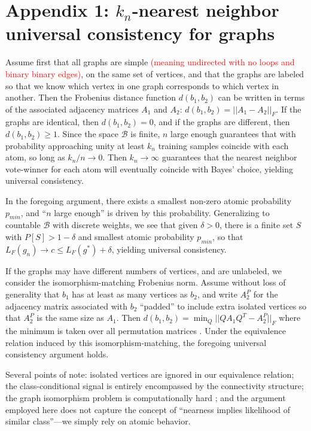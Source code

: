 \documentclass{article}
\newcommand{\mB}{\mathcal{B}}
\providecommand{\tr}[1]{\textcolor{red}{#1}}
\begin{document}
\section*{Appendix 1: $k_n$-nearest neighbor universal consistency for graphs}
\label{proof}

Assume first that all graphs are simple \tr{(meaning undirected with no loops and binary binary edges)}, on the same set of vertices, and that the graphs are labeled so that we know which vertex in one graph corresponds to which vertex in another. Then the Frobenius distance function $d(b_1,b_2)$ can be written in terms of the associated adjacency matrices $A_1$ and $A_2$: $d(b_1,b_2) = ||A_1-A_2||_F$. If the graphs are identical, then $d(b_1,b_2) = 0$, and if the graphs are different, then $d(b_1,b_2) \geq 1$. Since the space $\mB$ is finite, $n$ large enough guarantees that with probability approaching unity at least $k_n$ training samples coincide with each atom, so long as $k_n/n \rightarrow 0$. Then $k_n \rightarrow \infty$ guarantees that the nearest neighbor vote-winner for each atom will eventually coincide with Bayes' choice, yielding universal consistency.

In the foregoing argument, there exists a smallest non-zero atomic probability $p_{min}$, and ``$n$ large enough'' is driven by this probability. Generalizing to countable $\mB$ with discrete weights, we see that given $\delta > 0$, there is a finite set $S$ with $P[S]>1-\delta$ and smallest atomic probability $p_{min}$, so that $L_{F}(g_n) \rightarrow c \leq L_{F}(g^*) + \delta$, yielding universal consistency.

If the graphs may have different numbers of vertices, and are unlabeled, we consider the isomorphism-matching Frobenius norm. Assume without loss of generality that $b_1$ has at least as many vertices as $b_2$, and write $A_2^P$ for the adjacency matrix associated with $b_2$ ``padded'' to include extra isolated vertices so that $A_2^P$ is the same size as $A_1$. Then $d(b_1,b_2) = \min_Q ||Q A_1 Q^T - A_2^P||_F$ where the minimum is taken over all permutation matrices \cite{HornJohnson90}. Under the equivalence relation induced by this isomorphism-matching, the foregoing universal consistency argument holds.

Several points of note:  isolated vertices are ignored in our equivalence relation; the class-conditional signal is entirely encompassed by the connectivity structure; the graph isomorphism problem is computationally hard \cite{ConroyLouis97,ZaslavskiyVert08}; and the argument employed here does not capture the concept of ``nearness implies likelihood of similar class''---we simply rely on atomic behavior.
\end{document}
